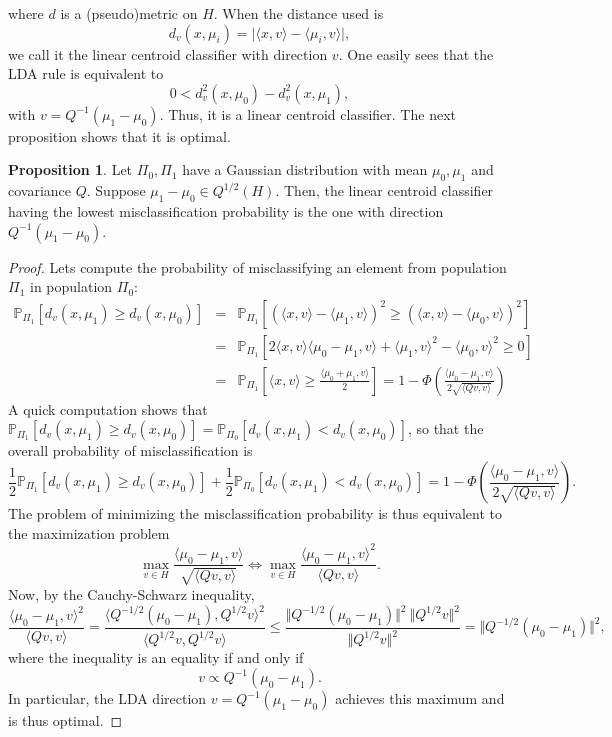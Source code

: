 \documentclass[10pt, a4paper]{report}
\newcommand{\Pp}[0]{\mathbb{P}}
\theoremstyle{definition}
\newtheorem{prop}{Proposition}
\theoremstyle{remark}
\begin{document}
where $d$ is a (pseudo)metric on $H$. When the distance used is 
$$d_v(x,\mu_i) = \vert \langle x,v \rangle - \langle \mu_i, v\rangle\vert,$$
we call it the linear centroid classifier with direction $v$. One easily sees that the LDA rule is equivalent to 
$$0 < d_v^2(x,\mu_0)-d_v^2(x,\mu_1),$$
with $v=Q^{-1}(\mu_1-\mu_0)$. Thus, it is a linear centroid classifier. The next proposition shows that it is optimal. 
\begin{prop}
	Let $\Pi_0,\Pi_1$ have a Gaussian distribution with mean $\mu_0,\mu_1$ and covariance $Q$. Suppose $\mu_1-\mu_0 \in Q^{1/2}(H)$. Then, the linear centroid classifier having the lowest misclassification probability is the one with direction $Q^{-1}(\mu_1-\mu_0)$.
	\begin{proof}
		Lets compute the probability of misclassifying an element from population $\Pi_1$ in population $\Pi_0$:
		\begin{eqnarray*}
			\Pp_{\Pi_1}\left[d_v(x,\mu_1)\geq d_v(x,\mu_0)\right] & = & \Pp_{\Pi_1}\left[\left(\langle x,v\rangle- \langle \mu_1,v\rangle\right)^2\geq \left(\langle x,v\rangle- \langle \mu_0,v\rangle\right)^2\right] \\
			& = & \Pp_{\Pi_1}\left[2\langle x,v \rangle\langle \mu_0-\mu_1,v \rangle + \langle \mu_1,v \rangle^2 - \langle \mu_0,v \rangle^2 \geq 0 \right] \\
			& = & \Pp_{\Pi_1}\left[ \langle x, v \rangle \geq \frac{\langle \mu_0 + \mu_1, v \rangle}{2}  \right] = 1 - \Phi\left(\frac{\langle\mu_0-\mu_1,v\rangle}{2\sqrt{\langle Qv,v\rangle}}\right)
		\end{eqnarray*}
		A quick computation shows that $\Pp_{\Pi_1}\left[d_v(x,\mu_1)\geq d_v(x,\mu_0)\right] = \Pp_{\Pi_0}\left[d_v(x,\mu_1) < d_v(x,\mu_0)\right]$, so that the overall probability of misclassification is 
		$$\frac{1}{2}  \Pp_{\Pi_1}\left[d_v(x,\mu_1)\geq d_v(x,\mu_0)\right] + \frac{1}{2}\Pp_{\Pi_0}\left[d_v(x,\mu_1) < d_v(x,\mu_0)\right] = 1 - \Phi\left(\frac{\langle\mu_0-\mu_1,v\rangle}{2\sqrt{\langle Qv,v\rangle}}\right).$$
		The problem of minimizing the misclassification probability is thus equivalent to the maximization problem
		$$ \max_{v\in H} \frac{\langle\mu_0-\mu_1,v\rangle}{\sqrt{\langle Qv,v\rangle}} \iff \max_{v\in H} \frac{\langle\mu_0-\mu_1,v\rangle^2}{\langle Qv,v\rangle}.$$
		Now, by the Cauchy-Schwarz inequality, 
		$$ \frac{\langle\mu_0-\mu_1,v\rangle^2}{\langle Qv,v\rangle} = \frac{\langle Q^{-1/2}(\mu_0-\mu_1),Q^{1/2}v\rangle^2}{\langle Q^{1/2}v,Q^{1/2}v\rangle} \leq \frac{\Vert Q^{-1/2}(\mu_0-\mu_1)\Vert^2 \ \Vert Q^{1/2}v\Vert^2 }{\Vert Q^{1/2}v\Vert^2} = \Vert Q^{-1/2}(\mu_0-\mu_1)\Vert^2,$$
		where the inequality is an equality if and only if 
		$$ v \propto Q^{-1}(\mu_0-\mu_1).$$
		In particular, the LDA direction $v=Q^{-1}(\mu_1-\mu_0)$ achieves this maximum and is thus optimal.
	\end{proof}
\end{prop}
\end{document}
